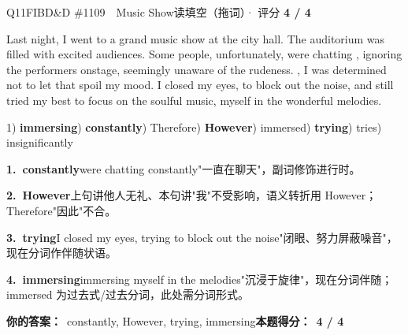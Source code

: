 \begin{qblock}{Q11\quad FIBD\&D \#1109\ \ Music Show}{读填空（拖词）· 评分 \textcolor{cAccent}{\bfseries 4 / 4}}
\begin{promptbox}
Last night, I went to a grand music show at the city hall. The auditorium was filled with excited audiences. Some people, unfortunately, were chatting , ignoring the performers onstage, seemingly unaware of the rudeness. , I was determined not to let that spoil my mood. I closed my eyes,  to block out the noise, and still tried my best to focus on the soulful music,  myself in the wonderful melodies.
\end{promptbox}
{\small 1) \textbf{immersing}) \textbf{constantly}) Therefore) \textbf{However}) immersed) \textbf{trying}) tries) insignificantly}
\begin{notebox}\footnotesize
\textbf{1.\ constantly}\quad were chatting constantly"一直在聊天"，副词修饰进行时。\par\smallskip
\textbf{2.\ However}\quad 上句讲他人无礼、本句讲"我"不受影响，语义转折用 However；Therefore"因此"不合。\par\smallskip
\textbf{3.\ trying}\quad I closed my eyes, trying to block out the noise"闭眼、努力屏蔽噪音"，现在分词作伴随状语。\par\smallskip
\textbf{4.\ immersing}\quad immersing myself in the melodies"沉浸于旋律"，现在分词伴随；immersed 为过去式/过去分词，此处需分词形式。
\end{notebox}
\smallskip
\textbf{你的答案：}\ constantly, However, trying, immersing\qquad\textbf{本题得分：}\ {\color{cAccent}\bfseries 4 / 4}
\end{qblock}

